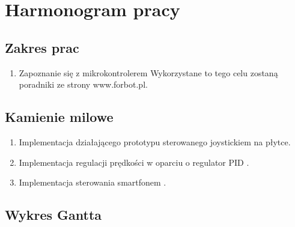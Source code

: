 \documentclass[10pt, a4paper]{article}
\begin{document}
\section{Harmonogram pracy}

\subsection{Zakres prac}
	\begin{enumerate}
		\item Zapoznanie się z mikrokontrolerem
		\newline
		Wykorzystane to tego celu zostaną poradniki ze strony www.forbot.pl. \cite{kurs1, kurs2, kurs3}
	\end{enumerate}
\subsection{Kamienie milowe}
	\begin{enumerate}
		\item Implementacja działającego prototypu sterowanego joystickiem na płytce.
		\item Implementacja regulacji prędkości w oparciu o regulator PID \cite{kurs5 , kurs6, kurs7}.
		\item Implementacja sterowania smartfonem \cite{kurs4}.
	\end{enumerate}

\subsection{Wykres Gantta}
\end{document}
